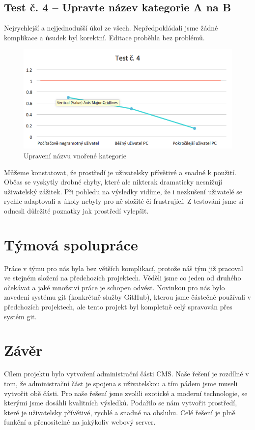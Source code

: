 \documentclass[11pt,a4paper]{article}
\begin{document}
\subsection*{Test č. 4 -- Upravte název kategorie A na B}
Nejrychlejší a nejjednodušší úkol ze všech. Nepředpokládali jsme žádné komplikace a úsudek byl korektní. Editace proběhla bez problémů.

\begin{figure}[!ht]
    \centering
    \includegraphics[width=\textwidth]{t4.png}
    \caption{Upravení názvu vnořené kategorie}
\end{figure}


Můžeme konstatovat, že prostředí je uživatelsky přívětivé a snadné k použití. Občas se vyskytly drobné chyby, které ale nikterak dramaticky nesnižují uživatelský zážitek. Při pohledu na výsledky vidíme, že i nezkušení uživatelé se rychle adaptovali a úkoly nebyly pro ně složité či frustrující. Z testování jsme si odnesli důležité poznatky jak prostředí vylepšit.


\section*{Týmová spolupráce}
Práce v týmu pro nás byla bez větších komplikací, protože náš tým již pracoval ve stejném složení na předchozích projektech. Věděli jsme co jeden od druhého očekávat a jaké množství práce je schopen odvést. Novinkou pro nás bylo zavedení systému git\cite{git} (konkrétně služby GitHub), kterou jsme částečně používali v předchozích projektech, ale tento projekt byl kompletně celý spravován přes systém git.


\section*{Závěr}
Cílem projektu bylo vytvoření administrační části CMS. Naše řešení je rozdílné v tom, že administrační část je spojena s uživatelskou a tím pádem jsme museli vytvořit obě části. Pro naše řešení jsme zvolili exotické a moderní technologie, se kterými jsme dosáhli kvalitních výsledků. Podařilo se nám vytvořit prostředí, které je uživatelsky přívětivé, rychlé a snadné na obsluhu. Celé řešení je plně funkční a přenositelné na jakýkoliv webový server.
\end{document}
